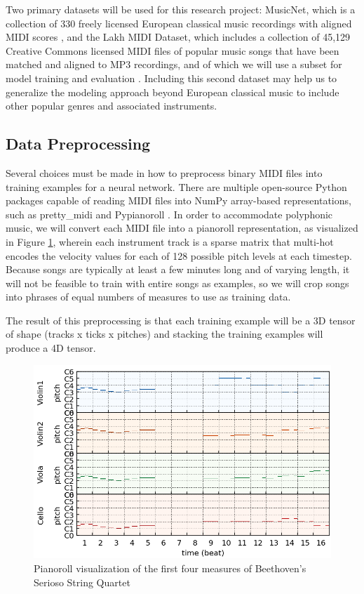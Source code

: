 \documentclass[sigconf,authorversion]{acmart}
\begin{document}
Two primary datasets will be used for this research project: MusicNet,
which is a collection of 330 freely licensed European classical music
recordings with aligned MIDI scores \cite{thickstun2017learning}, and
the Lakh MIDI Dataset, which includes a collection of 45,129 Creative
Commons licensed MIDI files of popular music songs that have been
matched and aligned to MP3 recordings, and of which we will use a
subset for model training and evaluation
\cite{raffel_learning-based_2016}. Including this second dataset may
help us to generalize the modeling approach beyond European classical
music to include other popular genres and associated instruments.

\subsection{Data Preprocessing}

Several choices must be made in how to preprocess binary MIDI files
into training examples for a neural network. There are multiple
open-source Python packages capable of reading MIDI files into NumPy
array-based representations, such as pretty\_midi
\cite{raffel_pretty_midi_2014} and Pypianoroll
\cite{dong_pypianoroll_2018}. In order to accommodate polyphonic
music, we will convert each MIDI file into a pianoroll representation,
as visualized in Figure \ref{pianoroll}, wherein each instrument track
is a sparse matrix that multi-hot encodes the velocity values for each
of 128 possible pitch levels at each timestep. Because songs are
typically at least a few minutes long and of varying length, it will
not be feasible to train with entire songs as examples, so we will
crop songs into phrases of equal numbers of measures to use as
training data.

The result of this preprocessing is that each training example will be
a 3D tensor of shape (tracks x ticks x pitches) and stacking the
training examples will produce a 4D tensor.

\begin{figure}[h]
  \centering
  \includegraphics[width=\linewidth]{first_four_bars.png}
  \caption{Pianoroll visualization of the first four measures of
    Beethoven's Serioso String Quartet}
  \label{pianoroll}
\end{figure}
\end{document}

